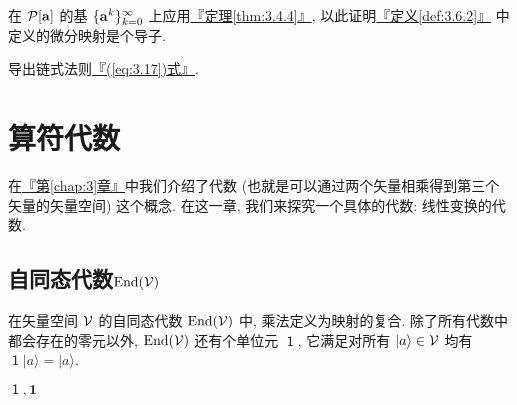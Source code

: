 \documentclass[lang=cn,zihao=-4,twoside,fontset=none]{textbook}
\DeclareMathOperator{\End}{End}
\newcommand{\bsf}[1]{{\mathop{\pmb{\mathsf{#1}}}}}
\renewcommand{\eqref}[1]{\hyperref[#1]{『\textnormal{(\ref*{#1})}式』}}
\newcommand{\chapref}[1]{\hyperref[#1]{『第\textnormal{\ref*{#1}}章』}}
\newcommand{\thmref}[1]{\hyperref[#1]{『定理\textnormal{\ref*{#1}}』}}
\newcommand{\defref}[1]{\hyperref[#1]{『定义\textnormal{\ref*{#1}}』}}
\newcommand{\set}[1]{\{#1\}}
\newcommand{\bfid}{\mathbf{1}}
\renewcommand{\ket}[1]{| #1 \rangle}
\begin{document}
\begin{problem}
    \label{ex:3.35}%
    在 ${\mathcal P}[{\mathbf a}]$ 的基 $\set{\bfa^k}_{k=0}^\infty$ 上应用\thmref{thm:3.4.4}, 以此证明\defref{def:3.6.2} 中定义的微分映射是个导子.
\end{problem}

\begin{problem}
    \label{ex:3.36}%
    导出链式法则\eqref{eq:3.17}.
\end{problem}



\chapter{算符代数}\label{sec:chap:4}

在\chapref{chap:3}中我们介绍了代数 (也就是可以通过两个矢量相乘得到第三个矢量的矢量空间) 这个概念. 在这一章, 我们来探究一个具体的代数: 线性变换的代数. 

\section{自同态代数\texorpdfstring{$\End(\mV)$}{End(V)}}

在矢量空间 ${\mathcal V}$ 的自同态代数 $\End(\mV)$ 中, 乘法定义为映射的复合. 除了所有代数中都会存在的零元以外, $\End(\mV)$ 还有个单位元 $\bsf{1}$, 它满足对所有 $\ket{a}\in\mV$ 均有 $\bsf{1}\ket{a}=\ket{a}$. 

$\bsf{1},\bfid$


\printindex[nidx]
\restoregeometry


%

\end{document}
